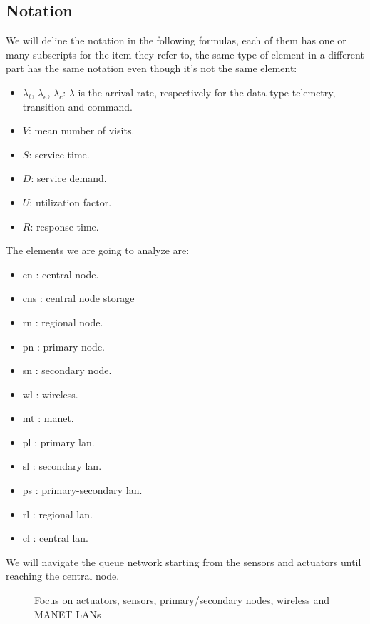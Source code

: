 \documentclass[11pt]{article}
\begin{document}
\subsection{Notation}
We will deline the notation in the following formulas, each of them has one or many subscripts for the item they refer to, the same type of element in a different part has the same notation even though it's not the same element:
\begin{itemize}
\item $\lambda_t$, $\lambda_e$, $\lambda_c$: $\lambda$ is the arrival rate, respectively for the data type telemetry, transition and command.
\item $V$: mean number of visits.
\item $S$: service time.
\item $D$: service demand.
\item $U$: utilization factor.
\item $R$: response time.
\end{itemize}
The elements we are going to analyze are:
\begin{itemize}
\item cn : central node.
\item cns : central node storage
\item rn : regional node.
\item pn : primary node.
\item sn : secondary node.
\item wl : wireless.
\item mt : manet.
\item pl : primary lan.
\item sl : secondary lan.
\item ps : primary-secondary lan.
\item rl : regional lan.
\item cl : central lan.
\end{itemize}
We will navigate the queue network starting from the sensors and actuators until reaching the central node.

\begin{figure}[H]
	\centering
	\frame{}
	\caption{Focus on actuators, sensors,  primary/secondary nodes, wireless and MANET LANs}
\end{figure}
\end{document}
